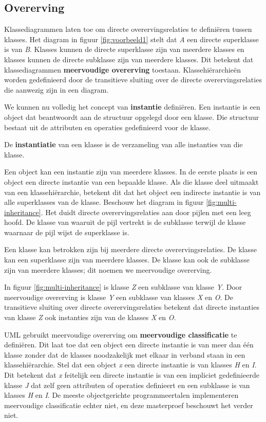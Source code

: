 \subsection{Overerving}\label{sec:semantics-gen}

Klassediagrammen laten toe om directe overervingsrelaties te defini\"eren tussen klasses. Het diagram in figuur \ref{fig:voorbeeld1} stelt dat \textit{A} een directe superklasse is van \textit{B}. Klasses kunnen de directe superklasse zijn van meerdere klasses en klasses kunnen de directe subklasse zijn van meerdere klasses. Dit betekent dat klassediagrammen \textbf{meervoudige overerving} toestaan. Klassehi\"erarchie\"en worden gedefinieerd door de transitieve sluiting over de directe overervingsrelaties die aanwezig zijn in een diagram.

We kunnen nu volledig het concept van \textbf{instantie} defini\"eren. Een instantie is een object dat beantwoordt aan de structuur opgelegd door een klasse. Die structuur bestaat uit de attributen en operaties gedefinieerd voor de klasse.

De \textbf{instantiatie} van een klasse is de verzameling van alle instanties van die klasse.

Een object kan een instantie zijn van meerdere klasses. In de eerste plaats is een object een directe instantie van een bepaalde klasse. Als die klasse deel uitmaakt van een klassehi\"erarchie, betekent dit dat het object een indirecte instantie is van alle superklasses van de klasse. Beschouw het diagram in figuur \ref{fig:multi-inheritance}. Het duidt directe overervingsrelaties aan door pijlen met een leeg hoofd. De klasse van waaruit de pijl vertrekt is de subklasse terwijl de klasse waarnaar de pijl wijst de superklasse is.

Een klasse kan betrokken zijn bij meerdere directe overervingsrelaties. De klasse kan een superklasse zijn van meerdere klasses. De klasse kan ook de subklasse zijn van meerdere klasses; dit noemen we meervoudige overerving.

In figuur \ref{fig:multi-inheritance} is klasse \textit{Z} een subklasse van klasse \textit{Y}. Door meervoudige overerving is klasse \textit{Y} een subklasse van klasses \textit{X} en \textit{O}. De transitieve sluiting over directe overervingsrelaties betekent dat directe instanties van klasse \textit{Z} ook instanties zijn van de klasses \textit{X} en \textit{O}.

UML gebruikt meervoudige overerving om \textbf{meervoudige classificatie}\cite{RumbaughJames2005Tuml} te defini\"eren. Dit laat toe dat een object een directe instantie is van meer dan \'e\'en klasse zonder dat de klasses noodzakelijk met elkaar in verband staan in een klassehi\"erarchie. Stel dat een object \textit{x} een directe instantie is van klasses \textit{H} en \textit{I}. Dit betekent dat \textit{x} feitelijk een directe instantie is van een impliciet gedefinieerde klasse \textit{J} dat zelf geen attributen of operaties definieert en een subklasse is van klasses \textit{H} en \textit{I}. De meeste objectgerichte programmeertalen implementeren meervoudige classificatie echter niet, en deze masterproef beschouwt het verder niet.

